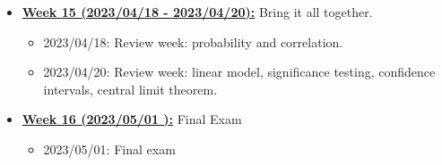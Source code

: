 \documentclass[11pt]{article}
\begin{document}
\begin{itemize}
  \item \underline{\textbf{Week 15 (2023/04/18 - 2023/04/20):}} Bring it all together. 
  \begin{itemize}
    \item 2023/04/18: Review week: probability and correlation. 
    \item 2023/04/20: Review week: linear model, significance testing, confidence intervals, central limit theorem. 
  \end{itemize}

  \item \underline{\textbf{Week 16 (2023/05/01 ):}} Final Exam
  \begin{itemize}
    \item 2023/05/01: Final exam
  \end{itemize}
\end{itemize}
\end{document}
